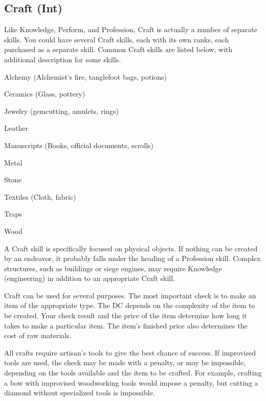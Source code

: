 \subsection{Craft (Int)}
Like Knowledge, Perform, and Profession, Craft is actually a number of separate skills. You could have several Craft skills, each with its own ranks, each purchased as a separate skill. Common Craft skills are listed below, with additional description for some skills.

\begin{itemize*}
  \item Alchemy (Alchemist's fire, tanglefoot bags, potions)
  \item Ceramics (Glass, pottery)
  \item Jewelry (gemcutting, amulets, rings)
  \item Leather
  \item Manuscripts (Books, official documents, scrolls)
  \item Metal
  \item Stone
  \item Textiles (Cloth, fabric)
  \item Traps
  \item Wood
\end{itemize*}

A Craft skill is specifically focused on physical objects. If nothing can be created by an endeavor, it probably falls under the heading of a Profession skill. Complex structures, such as buildings or siege engines, may require Knowledge (engineering) in addition to an appropriate Craft skill.

 Craft can be used for several purposes. The most important check is to make an item of the appropriate type. The DC depends on the complexity of the item to be created. Your check result and the price of the item determine how long it takes to make a particular item. The item's finished price also determines the cost of raw materials.

All crafts require artisan's tools to give the best chance of success. If improvised tools are used, the check may be made with a penalty, or may be impossible, depending on the tools available and the item to be crafted. For example, crafting a bow with improvised woodworking tools would impose a  penalty, but cutting a diamond without specialized tools is impossible.

